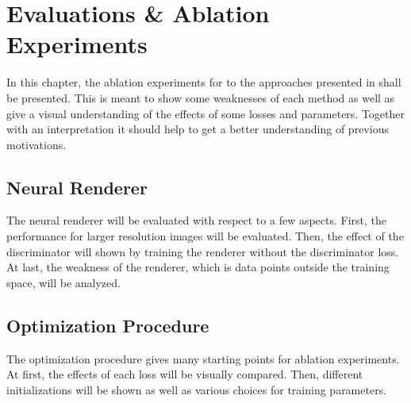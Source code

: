 \setchapterpreamble[u]{\margintoc}
\chapter{Evaluations \& Ablation Experiments}

In this chapter, the ablation experiments for to the approaches presented in 
shall be presented.
This is meant to show some weaknesses of each method as well as give a visual understanding
of the effects of some losses and parameters.
Together with an interpretation it should help to get a better understanding of previous
motivations.


\section{Neural Renderer}

The neural renderer will be evaluated with respect to a few aspects.
First, the performance for larger resolution images will be evaluated.
Then, the effect of the discriminator will shown by training the renderer without
the discriminator loss.
At last, the weakness of the renderer, which is data points outside the training space,
will be analyzed.

\section{Optimization Procedure}

The optimization procedure gives many starting points for ablation experiments.
At first, the effects of each loss will be visually compared.
Then, different initializations will be shown as well as various choices for training
parameters.


